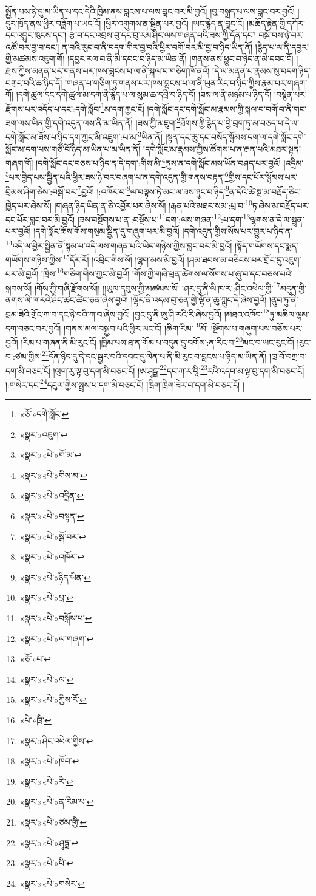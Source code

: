 སྨྱོན་པས་ཉེ་དུ་མ་ཡིན་པ་དང་དེའི་ཁྱིམ་ནས་བླངས་པ་ལས་བླང་བར་མི་བྱའོ། །བུ་བསྐྲད་པ་ལས་བླང་བར་བྱའོ། །དུར་ཁྲོད་ནས་ཕྱིར་བཟློག་པ་ཡང་ངོ། །ཕྱིར་འགུགས་ན་སྦྱིན་པར་བྱའོ། །ཡང་རྙེད་ན་བླང་ངོ། །མཆོད་རྟེན་གྱི་དཀོར་དང་འབྱུང་ཁུངས་དང་། རྩ་བ་དང་འབྲས་བུ་དང་བུ་རམ་ཤིང་ལས་གཞན་པའི་ཟས་ཀྱི་དོན་དང་། བསྐོ་བས་ཉེ་བར་འཚོ་བར་བྱ་བ་དང་། ན་བའི་རུང་བ་ནི་བདག་གིར་བྱ་བའི་ཕྱིར་བགོ་བར་མི་བྱ་བ་ཉིད་ཡིན་ནོ། །རྙེད་པ་ལ་ནི་དབྱར་གྱི་མཚམས་འཇུག་གོ། །དབྱར་རལ་བ་ནི་མི་དབང་བ་ཉིད་མ་ཡིན་ནོ། །གནས་ནས་ཕྱུང་བ་ཉིད་ན་མི་དབང་ངོ། །རྫས་ཀྱིས་མནན་པར་གནས་པར་ཁས་བླངས་པ་ལ་ནི་སྐལ་བ་གཅིག་ཁོ་ནའོ། །དེ་ལ་མནན་པ་རྣམས་སུ་བདག་ཉིད་བགྲང་བའི་ཆ་ཉིད་དོ། །གཞན་པ་གཅིག་ཏུ་གནས་པར་ཁས་བླངས་པ་ལ་ནི་ཡུན་རིང་བ་ཉིད་ཀྱིས་རྣམ་པར་གཞག་གོ། །དགེ་ཚུལ་དང་དགེ་ཚུལ་མ་དག་ནི་རྙེད་པ་ལ་སུམ་ཆ་དབྲི་བ་ཉིད་དོ། །ཟས་ལ་ནི་མཉམ་པ་ཉིད་དོ། །བསྙེན་པར་རྫོགས་པར་འདོད་པ་དང་:དགེ་སློབ་\footnote{«ཅོ་»དགེ་སློང་}མ་དག་ཀྱང་ངོ། །དགེ་སློང་དང་དགེ་སློང་མ་རྣམས་ཀྱི་སྐལ་བ་བགོ་བ་ནི་གང་ཟག་ལས་ཡིན་གྱི་དགེ་འདུན་ལས་ནི་མ་ཡིན་ནོ། །ཟས་ཀྱི་མཇུག་\footnote{«སྣར་»འཇུག་}ཐོགས་ཀྱི་རྙེད་པ་བྱེ་བྲག་ཏུ་མ་བཅད་པ་དེ་ལ་དགེ་སློང་མ་ཟོས་པ་ཉིད་དག་ཀྱང་མི་འཇུག་:པ་མ་\footnote{«སྣར་»«པེ་»གོ་མ་}ཡིན་ནོ། །སྟན་དང་ཆུ་དང་བསོད་སྙོམས་དག་ལ་དགེ་སློང་དགེ་སློང་མ་དག་པས་གཙོ་བོ་ཉིད་མ་ཡིན་པ་མ་ཡིན་ནོ། །དགེ་སློང་མ་རྣམས་ཀྱིས་ཚོགས་པ་ན་རྒན་པའི་མཐར་སྟན་གཞག་གོ། །དགེ་སློང་དང་བཅས་པ་ཉིད་ན་དེ་དག་:གིས་མི་\footnote{«སྣར་»«པེ་»གིས་མ་}ནུས་ན་དགེ་སློང་མས་ཡོན་བཤད་པར་བྱའོ། །འདྲིམ་\footnote{«སྣར་»«པེ་»འདྲིན་}པར་བྱེད་པས་སྦྱིན་པའི་ཕྱིར་ཟས་ཉེ་བར་བཞག་པ་ན་དགེ་འདུན་གྱི་གནས་བརྟན་\footnote{«སྣར་»«པེ་»བསྟན་}གྱིས་དང་པོར་སྙོམས་པར་བྲིམས་ཤིག་ཅེས་:བསྒོ་བར་\footnote{«སྣར་»«པེ་»སྒོ་བར་}བྱའོ། །:འཁོར་བ་\footnote{«སྣར་»«པེ་»འཁོར་}ལ་བལྟས་ཏེ་མང་ལ་ཟས་ཉུང་བ་ཉིད་\footnote{«སྣར་»«པེ་»ཉིད་ཡིན་}ན་དེའི་ཚེ་སྔ་མ་བརྗོད་ཅིང་ཁྱེད་པར་ཞེས་སོ། །གཞན་ཉིད་ཡིན་ན་ཅི་འབྱོར་པར་ཞེས་སོ། །རྒན་པའི་མཐར་སམ་:པྲ་བ་\footnote{«སྣར་»«པེ་»པྲ་}ཏ་ཞེས་མ་བརྗོད་པར་དང་པོར་བླང་བར་མི་བྱའོ། །ཟས་བསྔོགས་པ་ན་:བསྔོས་པ་\footnote{«སྣར་»«པེ་»བསྐོས་པ་}དག་:ལས་གཞན་\footnote{«སྣར་»«པེ་»ལ་གཞག་}:པ་དག་\footnote{«ཅོ་»པ་}ལྷགས་ན་དེ་ལ་སྦྲན་པར་བྱའོ། །དགེ་སློང་ཆོས་གོས་གསུམ་སྦྱིན་དུ་གཞུག་པར་མི་བྱའོ། །དགེ་འདུན་གྱིས་སོས་པར་གྱུར་པ་ཉིད་ན་\footnote{«སྣར་»«པེ་»ལ་}འདི་ལ་ཕྱིར་སྦྱིན་ནོ་སྙམ་པ་འདི་ལས་གཞན་པའི་ཡིད་གཉིས་ཀྱིས་བླང་བར་མི་བྱའོ། །སྟོད་གཡོགས་དང་སྨད་གཡོགས་གཉིས་ཀྱིས་\footnote{«སྣར་»«པེ་»ཀྱིས་རོ་}དོར་རོ། །འབྲིང་གིས་སོ། །ལྷག་མས་མི་བྱའོ། །ཤམ་ཐབས་མ་བཅིངས་པར་གྲོང་དུ་འཇུག་པར་མི་བྱའོ། །ཁྲིས་\footnote{«པེ་»ཁྲི་}གཅིག་གིས་ཀྱང་མི་བྱའོ། །གོས་ཀྱི་གཞི་ཕྲན་ཚེགས་ལ་སོགས་པ་ཞུ་བ་དང་བཅས་པའི་སྐབས་སོ། །གོས་ཀྱི་གཞི་རྫོགས་སོ།། །།ཡུལ་དབུས་ཀྱི་མཚམས་སོ། །ཤར་དུ་ནི་ལི་ཁ་ར་:ཤིང་འཕེལ་གྱི་\footnote{«སྣར་»ཤིང་འཕེལ་གྱིས་}མདུན་གྱི་ནགས་ལི་ཁ་རའི་ཤིང་ཚང་ཚིང་ཅན་ཞེས་བྱའོ། །ལྷོར་ནི་འདམ་བུ་ཅན་གྱི་ལྷོ་ན་ཆུ་ཀླུང་དེ་ཞེས་བྱའོ། །ནུབ་ཏུ་ནི་བྲམ་ཟེའི་གྲོང་ཀ་བ་དང་ཉེ་བའི་ཀ་བ་ཞེས་བྱའོ། །བྱང་དུ་ནི་ཨུ་ཤི་རའི་རི་ཞེས་བྱའོ། །མཐའ་འཁོབ་\footnote{«སྣར་»«པེ་»ཁོབ་}ཏུ་མཆིལ་ལྷམ་དག་བཅང་བར་བྱའོ། །གནས་མལ་བསྐྱབ་པའི་ཕྱིར་ཡང་ངོ། །ཆིག་རིམ་\footnote{«སྣར་»«པེ་»རི་}མོ། །སྔོགས་པ་གཞུག་པས་བཅོས་པར་བྱའོ། །རིམ་པ་གཞན་ནི་མི་རུང་ངོ། །ཁྱིམ་པས་ཐ་ན་གོམ་པ་བདུན་དུ་བགོས་:ན་རིང་བ་\footnote{«སྣར་»«པེ་»ན་རིམ་པ་}མང་བ་ཡང་རུང་ངོ། །རུང་བ་:ཙམ་གྱིས་\footnote{«སྣར་»«པེ་»ཙམ་གྱི་}དོན་ཉིད་དུ་དེ་དང་སྦྱར་བའི་དབང་དུ་ལེན་པ་ནི་མི་རུང་བ་བླངས་པ་ཉིད་མ་ཡིན་ནོ། །ཁྲ་བོ་བཀྲ་བ་དག་མི་བཅང་ངོ། །ལུག་རུ་ལྟ་བུ་དག་མི་བཅང་ངོ། །ཨ་ཤྭདྠ་\footnote{«སྣར་»«པེ་»ཤྭཏྠ་}དང་ཀ་ར་བཱི་\footnote{«སྣར་»«པེ་»བི་}རའི་འདབ་མ་ལྟ་བུ་དག་མི་བཅང་ངོ། །:གསེར་དང་\footnote{«སྣར་»«པེ་»གསེར་}དངུལ་གྱིས་སྤྲས་པ་དག་མི་བཅང་ངོ། །ཁྲིག་ཁྲིག་ཟེར་བ་དག་མི་བཅང་ངོ། །
